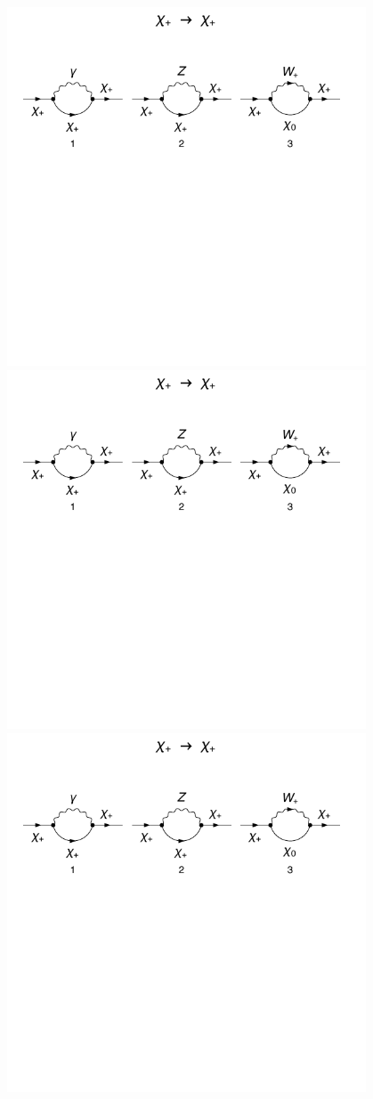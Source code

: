 \documentclass[11pt]{article}
\begin{document}
\noindent\begin{minipage}{0.3\textwidth}
\includegraphics[width=0.8\textwidth]{F1_1_a.pdf}\\
\includegraphics[width=0.8\textwidth]{F1_1_b.pdf}\\
\includegraphics[width=0.8\textwidth]{F1_1_c.pdf}
\end{minipage}
\end{document}
